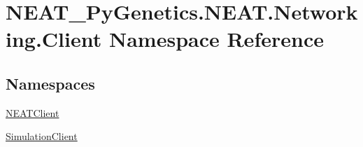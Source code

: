 \hypertarget{namespaceNEAT__PyGenetics_1_1NEAT_1_1Networking_1_1Client}{}\section{N\+E\+A\+T\+\_\+\+Py\+Genetics.\+N\+E\+A\+T.\+Networking.\+Client Namespace Reference}
\label{namespaceNEAT__PyGenetics_1_1NEAT_1_1Networking_1_1Client}
\subsection*{Namespaces}
\begin{DoxyCompactItemize}
\item 
 \hyperlink{namespaceNEAT__PyGenetics_1_1NEAT_1_1Networking_1_1Client_1_1NEATClient}{N\+E\+A\+T\+Client}
\item 
 \hyperlink{namespaceNEAT__PyGenetics_1_1NEAT_1_1Networking_1_1Client_1_1SimulationClient}{Simulation\+Client}
\end{DoxyCompactItemize}
